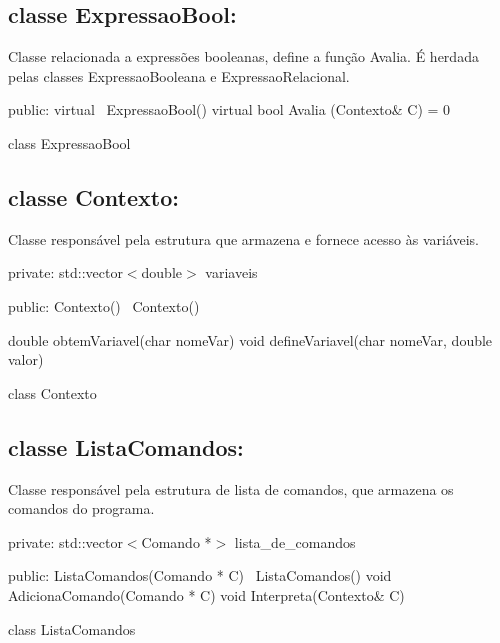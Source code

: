 \documentclass[12pt]{article}
\begin{document}
\subsection{classe ExpressaoBool:} 

Classe relacionada a expressões booleanas, define a função Avalia. É herdada pelas classes ExpressaoBooleana e ExpressaoRelacional.
\begin{algorithm}[h!]
\begin{footnotesize}
  
	public:
		virtual ~ExpressaoBool() {}\;
		virtual bool Avalia (Contexto\& C) = 0\;
	
\caption{class ExpressaoBool}%
\end{footnotesize}
\end{algorithm}

\subsection{classe Contexto:} 

Classe responsável pela estrutura que armazena e fornece acesso às variáveis.
\begin{algorithm}[h!]
\begin{footnotesize}
  
	private:
		std::vector$<$double$>$ variaveis\;

	public:
		Contexto()\;
		~Contexto()\;
		
		double	obtemVariavel(char nomeVar)\;
		void	defineVariavel(char nomeVar, double valor)\;
	
\caption{class Contexto}%
\end{footnotesize}
\end{algorithm}

\subsection{classe ListaComandos:} 

Classe responsável pela estrutura de lista de comandos, que armazena os comandos do programa.
\begin{algorithm}[h!]
\begin{footnotesize}
  
	private:
		std::vector$<$Comando *$>$ lista\_de\_comandos\;

	public:
		ListaComandos(Comando * C)\;
		~ListaComandos()\;
		void AdicionaComando(Comando * C)\;
		void Interpreta(Contexto\& C)\;
	
\caption{class ListaComandos}%
\end{footnotesize}
\end{algorithm}
\end{document}
